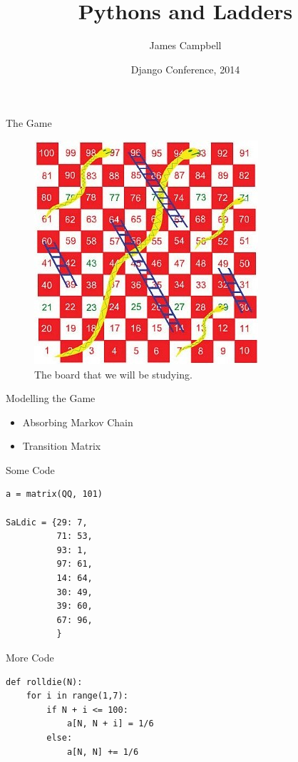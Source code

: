 \documentclass[14pt]{beamer}
\title{Pythons and Ladders}
\author{James Campbell}
\institute[Cardiff University]
  {
  Department of Mathematics\\
  Cardiff University
  }
\date{Django Conference, 2014}
\begin{document}
\begin{frame}
  \titlepage
\end{frame}

\begin{frame}{The Game}
  \begin{figure}[!htbp]
    \begin{center}
      \includegraphics[scale=2.2]{images/SALboard}
    \end{center}
    \caption{The board that we will be studying.}
  \end{figure}
\end{frame}

\begin{frame}{Modelling the Game}
  \begin{itemize}
    \itemsep2em
    \item Absorbing Markov Chain

    \item Transition Matrix
  \end{itemize}
\end{frame}

\begin{frame}[fragile]{Some Code}
  \begin{verbatim}
a = matrix(QQ, 101)

SaLdic = {29: 7,
          71: 53,
          93: 1,
          97: 61,
          14: 64,
          30: 49,
          39: 60,
          67: 96,
          }
  \end{verbatim}
\end{frame}

\begin{frame}[fragile]{More Code}
  \begin{verbatim}
def rolldie(N):
    for i in range(1,7):
        if N + i <= 100:
            a[N, N + i] = 1/6
        else:
            a[N, N] += 1/6
  \end{verbatim}
\end{frame}
\end{document}
